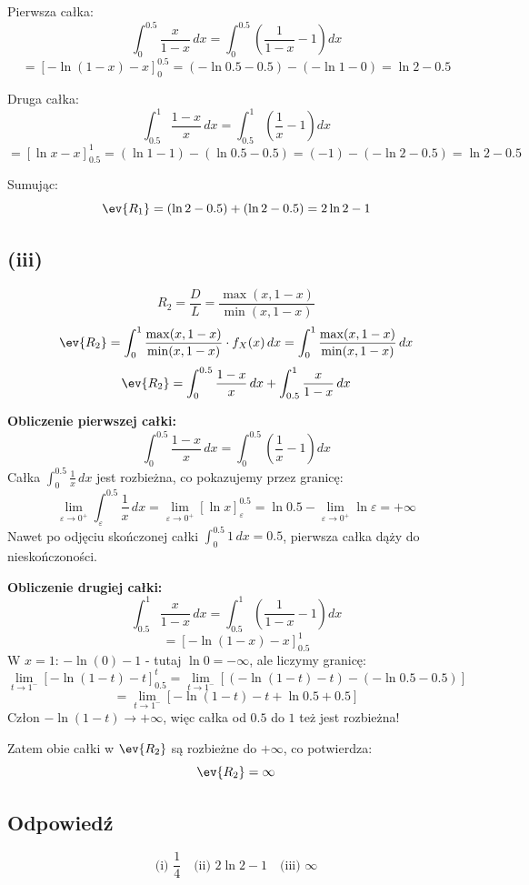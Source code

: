 Pierwsza całka:
\[
	\int_{0}^{0.5} \frac{x}{1-x} \, dx = \int_{0}^{0.5} \left( \frac{1}{1-x} - 1 \right) dx
\]
\[
	= \left[ -\ln(1-x) - x \right]_{0}^{0.5} = \left( -\ln 0.5 - 0.5 \right) - \left( -\ln 1 - 0 \right) = \ln 2 - 0.5
\]

Druga całka:
\[
	\int_{0.5}^{1} \frac{1-x}{x} \, dx = \int_{0.5}^{1} \left( \frac{1}{x} - 1 \right) dx
\]
\[
	= \left[ \ln x - x \right]_{0.5}^{1} = (\ln 1 - 1) - (\ln 0.5 - 0.5) = (-1) - (-\ln 2 - 0.5) = \ln 2 - 0.5
\]

Sumując:
\[
	\ev{R_1} = (\ln 2 - 0.5) + (\ln 2 - 0.5) = 2\ln 2 - 1
\]

\subsection*{(iii)}
\[
	R_2 = \frac{D}{L} = \frac{\max(x, 1-x)}{\min(x, 1-x)}
\]
\[
	\ev{R_2} = \int_{0}^{1} \frac{\max(x, 1-x)}{\min(x, 1-x)} \cdot f_X(x) \, dx = \int_{0}^{1} \frac{\max(x, 1-x)}{\min(x, 1-x)} \, dx
\]
\[
	\ev{R_2} = \int_{0}^{0.5} \frac{1-x}{x} \, dx + \int_{0.5}^{1} \frac{x}{1-x} \, dx
\]

\noindent\textbf{Obliczenie pierwszej całki:}
\[
	\int_{0}^{0.5} \frac{1-x}{x} \, dx = \int_{0}^{0.5} \left( \frac{1}{x} - 1 \right) dx
\]
Całka \(\int_{0}^{0.5} \frac{1}{x} \, dx\) jest rozbieżna, co pokazujemy przez granicę:
\[
	\lim_{\varepsilon \to 0^+} \int_{\varepsilon}^{0.5} \frac{1}{x} \, dx = \lim_{\varepsilon \to 0^+} \left[ \ln x \right]_{\varepsilon}^{0.5} = \ln 0.5 - \lim_{\varepsilon \to 0^+} \ln \varepsilon = +\infty
\]
Nawet po odjęciu skończonej całki \(\int_{0}^{0.5} 1 \, dx = 0.5\), pierwsza całka dąży do nieskończoności.

\noindent\textbf{Obliczenie drugiej całki:}
\[
	\int_{0.5}^{1} \frac{x}{1-x} \, dx = \int_{0.5}^{1} \left( \frac{1}{1-x} - 1 \right) dx
\]
\[
	= \left[ -\ln(1-x) - x \right]_{0.5}^{1}
\]
W \(x=1\): \(-\ln(0) - 1\) - tutaj \(\ln 0 = -\infty\), ale liczymy granicę:
\[
	\lim_{t \to 1^-} \left[ -\ln(1-t) - t \right]_{0.5}^{t} = \lim_{t \to 1^-} \left[ (-\ln(1-t) - t) - (-\ln 0.5 - 0.5) \right]
\]
\[
	= \lim_{t \to 1^-} \left[ -\ln(1-t) - t + \ln 0.5 + 0.5 \right]
\]
Człon \(-\ln(1-t) \to +\infty\), więc całka od \(0.5\) do \(1\) też jest rozbieżna!

Zatem obie całki w \(\ev{R_2}\) są rozbieżne do \(+\infty\), co potwierdza:
\[
	\ev{R_2} = \infty
\]

\subsection*{Odpowiedź}
\[
	\boxed{\text{(i) } \frac14} \quad \boxed{\text{(ii) } 2\ln 2 - 1} \quad \boxed{\text{(iii) } \infty}
\]
